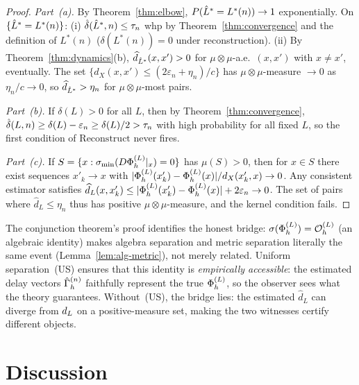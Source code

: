 \begin{proof}
\emph{Part~(a).}
By Theorem~\ref{thm:elbow}, $P(\hat{L}^* = L^*(n)) \to 1$ exponentially.
On $\{\hat{L}^* = L^*(n)\}$:
(i) $\hat{\delta}(\hat{L}^*,n) \leq \tau_n$ whp by Theorem~\ref{thm:convergence}
and the definition of $L^*(n)$ ($\delta(L^*(n)) = 0$ under reconstruction).
(ii) By Theorem~\ref{thm:dynamics}(b), $\widehat{d}_{\hat{L}^*}(x,x') > 0$
for $\mu \otimes \mu$-a.e.\ $(x,x')$ with $x \neq x'$, eventually.
The set $\{d_X(x,x') \leq (2\varepsilon_n + \eta_n)/c\}$ has
$\mu \otimes \mu$-measure $\to 0$ as $\eta_n/c \to 0$, so
$\widehat{d}_{\hat{L}^*} > \eta_n$ for $\mu\otimes\mu$-most pairs.

\emph{Part~(b).}
If $\delta(L) > 0$ for all $L$, then by Theorem~\ref{thm:convergence},
$\hat{\delta}(L,n) \geq \delta(L) - \varepsilon_n \geq \delta(L)/2 > \tau_n$
with high probability for all fixed $L$, so the first condition of
$\mathrm{Reconstruct}$ never fires.

\emph{Part~(c).}
If $S = \{x : \sigma_{\min}(D\Phi_h^{(L)}|_x) = 0\}$ has $\mu(S) > 0$,
then for $x \in S$ there exist sequences $x'_k \to x$ with
$|\Phi_h^{(L)}(x'_k) - \Phi_h^{(L)}(x)| / d_X(x'_k, x) \to 0$.
Any consistent estimator satisfies
$\widehat{d}_L(x, x'_k) \leq |\Phi_h^{(L)}(x'_k) - \Phi_h^{(L)}(x)| + 2\varepsilon_n \to 0$.
The set of pairs where $\widehat{d}_L \leq \eta_n$ thus has positive
$\mu \otimes \mu$-measure, and the kernel condition fails.
\end{proof}

\begin{remark}
The conjunction theorem's proof identifies the honest bridge:
$\sigma(\Phi_h^{(L)}) = \mathcal{O}_h^{(L)}$ (an algebraic identity) makes algebra separation
and metric separation literally the same event
(Lemma~\ref{lem:alg-metric}), not merely related.
Uniform separation~(US) ensures that this identity is \emph{empirically
accessible}: the estimated delay vectors $\hat{\Gamma}_h^{(n)}$ faithfully represent
the true $\Phi_h^{(L)}$, so the observer sees what the theory guarantees.
Without~(US), the bridge lies: the estimated $\widehat{d}_L$ can diverge
from $d_{L}$ on a positive-measure set, making the two witnesses
certify different objects.
\end{remark}

\section{Discussion}
\label{sec:discussion}

